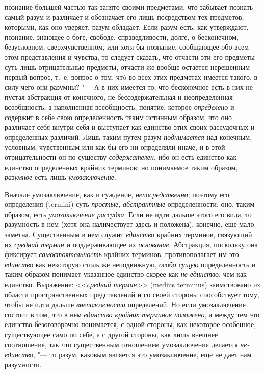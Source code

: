 {{познание
большей частью так занято своими предметами, что забывает
познать самый разум и различает и обозначает его лишь посредством тех
предметов, которыми, как оно уверяет, разум обладает. Если разум есть, как
утверждают, познание, знающее о боге, свободе, справедливости, долге, о
бесконечном, безусловном, сверхчувственном, или хотя бы познание,
сообщающее обо всем этом представления и чувства, то следует сказать, что
отчасти эти его предметы суть лишь отрицательные предметы, отчасти же
вообще остается нерешенным первый вопрос, т.~е. вопрос о том, чтó во всех
этих предметах имеется такого, в силу чего они разумны? "--- А
в них имеется то, что бесконечное есть в них не пустая абстракция от
конечного, не бессодержательная и неопределенная всеобщность, а наполненная
всеобщность, понятие, которое
{\em определено} и
содержит в себе свою определенность таким истинным образом, что оно
различает себя внутри себя и выступает как единство этих своих рассудочных
и определенных различий. Лишь таким путем разум
{\em поднимается} над
конечным, условным, чувственным или как бы его ни определяли иначе, и в
этой отрицательности он по существу
{\em содержателен}, ибо
он есть единство как единство определенных крайних терминов; но понимаемое
таким образом, {\em разумное}
есть лишь
{\em умозаключение}.

Вначале умозаключение, как и суждение,
{\em непосредственно};
поэтому его определения (termini) суть
{\em простые},
{\em абстрактные}
определенности; оно, таким образом, есть
{\em умозаключение рассудка}.
Если не идти дальше этого его вида, то разумность в нем (хотя
она наличествует здесь и положена), конечно, еще мало заметна. Существенным
в нем служит {\em единство}
крайних терминов, связующий их
{\em средний термин} и
поддерживающее их {\em основание}.
Абстракция, поскольку она фиксирует
{\em самостоятельность}
крайних терминов, противополагает им это
{\em единство} как
некоторую столь же неподвижную,
{\em особо сущую}
определенность и таким образом понимает
указанное единство скорее как
{\em не-единство}, чем
как единство. Выражение: <<{\em средний
термин}>> (medius terminus) заимствовано из области
пространственных представлений и со своей стороны способствует тому, чтобы
не идти дальше {\em внеположности}
определений. Но если умозаключение состоит в том, что в нем
{\em единство крайних терминов
положено}, а между тем это единство безоговорочно
понимается, с одной стороны, как некоторое особенное, существующее само по
себе, а с другой стороны, как лишь внешнее соотношение, так что
существенным отношением умозаключения делается
{\em не-единство}, "--- то
разум, каковым является это умозаключение, еще не дает нам разумности.

}}

